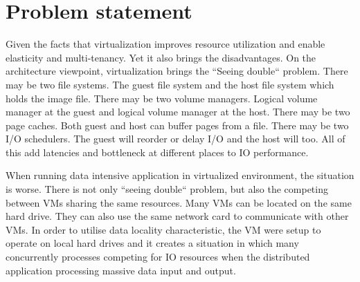 \documentclass{acmsig}
\begin{document}
%



\section{Problem statement}

Given the facts that virtualization improves resource utilization and enable elasticity and multi-tenancy. Yet it also brings the disadvantages. On the architecture viewpoint, virtualization brings the ``Seeing double`` problem. There may be two file systems. The guest file system and the host file system which holds the image file. There may be two volume managers. Logical volume manager at the guest and logical volume manager at the host. There may be two page caches. Both guest and host can buffer pages from a file. There may be two I/O schedulers. The guest will reorder or delay I/O and the host will too. All of this add latencies and bottleneck at different places to IO performance.

When running data intensive application in virtualized environment, the situation is worse. There is not only ``seeing double`` problem, but also the competing between VMs sharing the same resources. Many VMs can be located on the same hard drive. They can also use the same network card to communicate with other VMs. In order to utilise data locality characteristic, the VM were setup to operate on local hard drives and it creates a situation in which many concurrently processes competing for IO resources when the distributed application processing massive data input and output.
\end{document}
